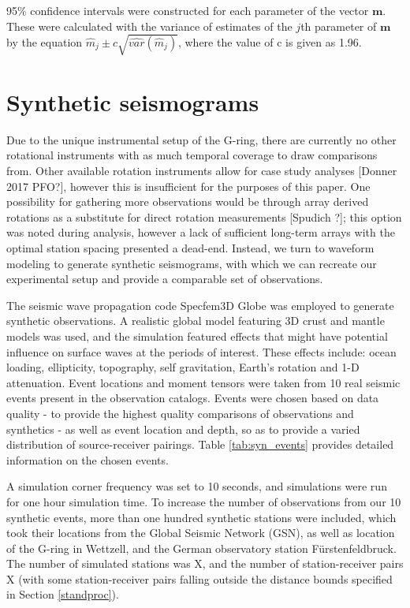 \documentclass{gji}
\begin{document}
95\% confidence intervals were constructed for each parameter of the vector $\mathbf{m}$. These were calculated with the variance of estimates of the $j$th parameter of $\mathbf{m}$ by the equation $\hat{m}_j \pm c \sqrt{\hat{var}(\hat{m}_j)}$, where the value of c is given as 1.96.

\section{Synthetic seismograms}
Due to the unique instrumental setup of the G-ring, there are currently no other rotational instruments with as much temporal coverage to draw comparisons from. Other available rotation instruments allow for case study analyses [Donner 2017 PFO?], however this is insufficient for the purposes of this paper. One possibility for gathering more observations would be through array derived rotations as a substitute for direct rotation measurements [Spudich ?]; this option was noted during analysis, however a lack of sufficient long-term arrays with the optimal station spacing presented a dead-end. Instead, we turn to waveform modeling to generate synthetic seismograms, with which we can recreate our experimental setup and provide a comparable set of observations.

The seismic wave propagation code Specfem3D Globe was employed to generate synthetic observations. A realistic global model featuring 3D crust and mantle models was used, and the simulation featured effects that might have potential influence on surface waves at the periods of interest. These effects include: ocean loading, ellipticity, topography, self gravitation, Earth's rotation and 1-D attenuation. Event locations and moment tensors were taken from 10 real seismic events present in the observation catalogs. Events were chosen based on data quality - to provide the highest quality comparisons of observations and synthetics - as well as event location and depth, so as to provide a varied distribution of source-receiver pairings. Table \ref{tab:syn_events} provides detailed information on the chosen events. 

A simulation corner frequency was set to 10 seconds, and simulations were run for one hour simulation time. To increase the number of observations from our 10 synthetic events, more than one hundred synthetic stations were included, which took their locations from the Global Seismic Network (GSN), as well as location of the G-ring in Wettzell, and the German observatory station F\"urstenfeldbruck. The number of simulated stations was X, and the number of station-receiver pairs X (with some station-receiver pairs falling outside the distance bounds specified in Section \ref{standproc}).
\end{document}
